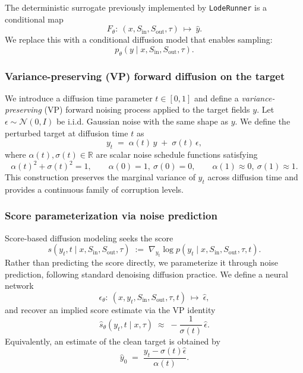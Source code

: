 \documentclass{article} %
\begin{document}
The deterministic surrogate previously implemented by \texttt{LodeRunner} is a conditional map
\[
F_\theta:\ (x,S_{\mathrm{in}},S_{\mathrm{out}},\tau)\ \mapsto\ \hat{y}.
\]
We replace this with a conditional diffusion model that enables sampling:
\[
p_\theta(y\mid x,S_{\mathrm{in}},S_{\mathrm{out}},\tau).
\]

\subsubsection{Variance-preserving (VP) forward diffusion on the target}
\label{subsec:vp_forward_diffusion}

We introduce a diffusion time parameter $t\in[0,1]$ and define a \emph{variance-preserving} (VP) forward
noising process applied to the target fields $y$. Let $\epsilon\sim\mathcal{N}(0,I)$ be i.i.d. Gaussian noise
with the same shape as $y$. We define the perturbed target at diffusion time $t$ as
\begin{equation}
y_t \;=\; \alpha(t)\,y \;+\; \sigma(t)\,\epsilon,
\label{eq:vp_forward}
\end{equation}
where $\alpha(t),\sigma(t)\in\mathbb{R}$ are scalar noise schedule functions satisfying
\begin{equation}
\alpha(t)^2 + \sigma(t)^2 = 1,\qquad \alpha(0)=1,\ \sigma(0)=0,\qquad \alpha(1)\approx 0,\ \sigma(1)\approx 1.
\label{eq:vp_constraint}
\end{equation}
This construction preserves the marginal variance of $y_t$ across diffusion time and provides a continuous
family of corruption levels.

\subsubsection{Score parameterization via noise prediction}
\label{subsec:score_param}

Score-based diffusion modeling seeks the score
\[
s(y_t,t\mid x,S_{\mathrm{in}},S_{\mathrm{out}},\tau) \;:=\; \nabla_{y_t}\log p(y_t\mid x,S_{\mathrm{in}},S_{\mathrm{out}},\tau,t).
\]
Rather than predicting the score directly, we parameterize it through noise prediction, following standard
denoising diffusion practice. We define a neural network
\begin{equation}
\epsilon_\theta:\ (x,y_t,S_{\mathrm{in}},S_{\mathrm{out}},\tau,t)\ \mapsto\ \widehat{\epsilon},
\label{eq:eps_model}
\end{equation}
and recover an implied score estimate via the VP identity
\begin{equation}
\widehat{s}_\theta(y_t,t\mid x,\tau) \;\approx\; -\frac{1}{\sigma(t)}\,\widehat{\epsilon}.
\label{eq:score_from_eps}
\end{equation}
Equivalently, an estimate of the clean target is obtained by
\begin{equation}
\widehat{y}_0 \;=\; \frac{y_t - \sigma(t)\widehat{\epsilon}}{\alpha(t)}.
\label{eq:y0_hat}
\end{equation}
\end{document}
